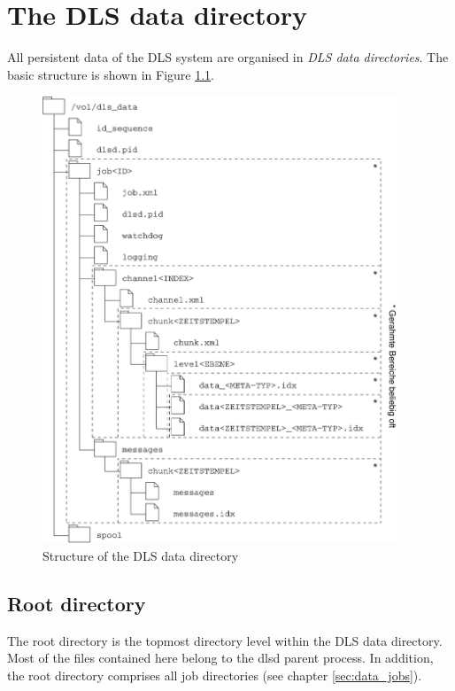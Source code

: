 \documentclass[a4paper,12pt,BCOR6mm,bibtotoc,idxtotoc]{scrbook}
\begin{document}

\chapter{The DLS data directory} \label{sec:data}

All persistent data of the DLS system are organised in \textit{DLS data directories}. The basic structure is shown in Figure \ref{fig:dls_data}.

\begin{figure}[htb] \begin{center} \includegraphics[width=300pt]{bilder/dls_data} \end{center} \caption{Structure of the DLS data directory} \label{fig:dls_data} \end{figure}


\section{Root directory} \label{sec:data_root}

The root directory is the topmost directory level within the DLS data directory. Most of the files contained here belong to the dlsd parent process. In addition, the root directory comprises all job directories (see chapter \ref{sec:data_jobs}).
\end{document}
